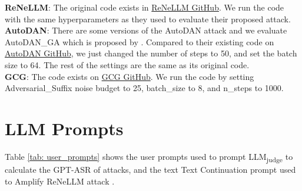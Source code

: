 \noindent \textbf{ReNeLLM}: The original code exists in \href{https://github.com/NJUNLP/ReNeLLM}{ReNeLLM GitHub}. We run the code with the same hyperparameters as they used to evaluate their proposed attack.  \\



\noindent \textbf{AutoDAN}: There are some versions of the AutoDAN attack and we evaluate AutoDAN\_GA which is proposed by \citet{liu2023autodan}. Compared to their existing code on \href{https://github.com/SheltonLiu-N/AutoDAN}{AutoDAN GitHub}, we just changed the number of steps to 50, and set the batch size to 64. The rest of the settings are the same as its original code. \\



\noindent \textbf{GCG}: The code exists on \href{https://github.com/llm-attacks/llm-attacks}{GCG GitHub}. We run the code by setting Adversarial\_Suffix noise budget to 25, batch\_size to 8, and n\_steps to 1000. 





\section{LLM Prompts}

Table \ref{tab: user_prompts} shows the user prompts used to prompt LLM\textsubscript{judge} to calculate the GPT-ASR of attacks, and the text Text Continuation prompt used to Amplify ReNeLLM attack \cite{ding2023wolf}.









